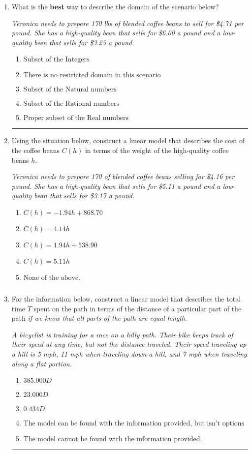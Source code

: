 \documentclass[14pt]{extbook}
\newcommand{\litem}[1]{\item#1\hspace*{-1cm}\rule{\textwidth}{0.4pt}}
\begin{document}
\begin{enumerate}
{\begin{enumerate}[label=\Alph*.]
\end{enumerate} }
\litem{
What is the \textbf{best} way to describe the domain of the scenario below?
\begin{center}
    \textit{ Veronica needs to prepare 170 lbs of blended coffee beans to sell for \$4.71 per pound. She has a high-quality bean that sells for \$6.00 a pound and a low-quality been that sells for \$3.25 a pound. }
\end{center}
\begin{enumerate}[label=\Alph*.]
\item \( \text{Subset of the Integers} \)
\item \( \text{There is no restricted domain in this scenario} \)
\item \( \text{Subset of the Natural numbers} \)
\item \( \text{Subset of the Rational numbers} \)
\item \( \text{Proper subset of the Real numbers} \)

\end{enumerate} }
\litem{
Using the situation below, construct a linear model that describes the cost of the coffee beans $C(h)$ in terms of the weight of the high-quality coffee beans $h$.
\begin{center}
    \textit{ Veronica needs to prepare 170 of blended coffee beans selling for \$4.16 per pound. She has a high-quality bean that sells for \$5.11 a pound and a low-quality bean that sells for \$3.17 a pound. }
\end{center}
\begin{enumerate}[label=\Alph*.]
\item \( C(h) = -1.94 h + 868.70 \)
\item \( C(h) = 4.14 h \)
\item \( C(h) = 1.94 h + 538.90 \)
\item \( C(h) = 5.11 h \)
\item \( \text{None of the above.} \)

\end{enumerate} }
\litem{
For the information below, construct a linear model that describes the total time $T$ spent on the path in terms of the distance of a particular part of the path \textit{if we know that all parts of the path are equal length}.
\begin{center}
    \textit{ A bicyclist is training for a race on a hilly path. Their bike keeps track of their speed at any time, but not the distance traveled. Their speed traveling up a hill is 5 mph, 11 mph when traveling down a hill, and 7 mph when traveling along a flat portion. }
\end{center}
\begin{enumerate}[label=\Alph*.]
\item \( 385.000 D \)
\item \( 23.000 D \)
\item \( 0.434 D \)
\item \( \text{The model can be found with the information provided, but isn't options 1-3.} \)
\item \( \text{The model cannot be found with the information provided.} \)


\end{enumerate}}
\end{enumerate}
\end{document}
